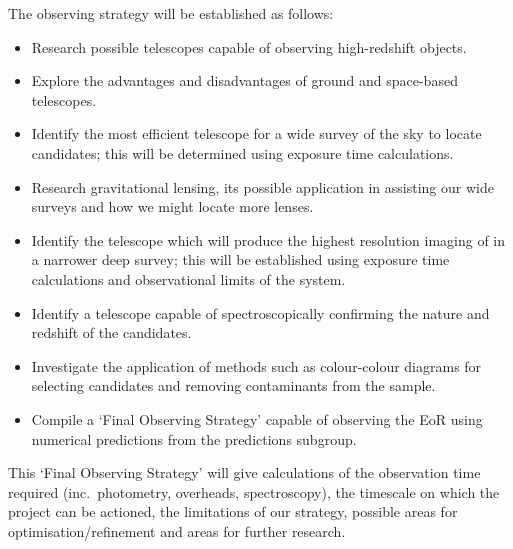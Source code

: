 	The observing strategy will be established as follows:
	\begin{itemize}
		\item Research possible telescopes capable of observing high-redshift objects.
		\item Explore the advantages and disadvantages of ground and space-based telescopes.
		\item Identify the most efficient telescope for a wide survey of the sky to locate candidates; this will be determined using exposure time calculations.
		\item Research gravitational lensing, its possible application in assisting our wide surveys and how we might locate more lenses.
		\item Identify the telescope which will produce the highest resolution imaging of in a narrower deep survey; this will be established using exposure time calculations and observational limits of the system.
		\item Identify a telescope capable of spectroscopically confirming the nature and redshift of the candidates.
		\item Investigate the application of methods such as colour-colour diagrams for selecting candidates and removing contaminants from the sample.
		\item Compile a `Final Observing Strategy' capable of observing the EoR using numerical predictions from the predictions subgroup.
	\end{itemize}
	This `Final Observing Strategy' will give calculations of the observation time required (inc.\ photometry, overheads, spectroscopy), the timescale on which the project can be actioned, the limitations of our strategy, possible areas for optimisation/refinement and areas for further research.


